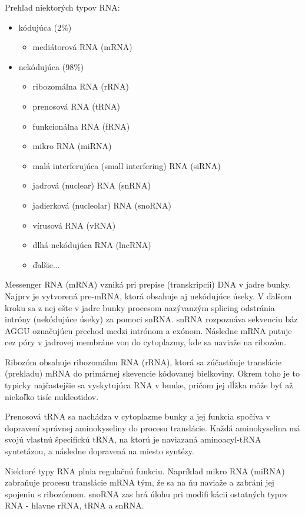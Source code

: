 \indent Prehľad niektorých typov RNA:
\begin{itemize}
\item kódujúca (2\%)
\begin{itemize}
\item mediátorová RNA (mRNA)
\end{itemize}
\item nekódujúca (98\%)
\begin{itemize}
\item ribozomálna RNA (rRNA)
\item prenosová RNA (tRNA)
\item funkcionálna RNA (fRNA)
\item mikro RNA (miRNA)
\item malá interferujúca (small interfering) RNA (siRNA)
\item jadrová (nuclear) RNA (snRNA)
\item jadierková (nucleolar) RNA (snoRNA)
\item vírusová RNA (vRNA)
\item dlhá nekódujúca RNA (lncRNA)
\item ďalšie...
\end{itemize}
\end{itemize}

\indent Messenger RNA (mRNA) vzniká pri prepise (transkripcii) DNA v jadre bunky. Najprv je vytvorená pre-mRNA, ktorá obsahuje aj nekódujúce úseky. V ďalšom kroku sa z nej ešte v jadre bunky procesom nazývanzým splicing odstránia intróny (nekódujúce úseky) za pomoci snRNA. snRNA rozpoznáva sekvenciu báz AGGU označujúcu prechod medzi intrónom  a exónom. Následne mRNA putuje cez póry v jadrovej membráne von do cytoplazmy, kde sa naviaže na ribozóm. \cite{Alberts02}


\indent Ribozóm obsahuje ribozomálnu RNA (rRNA), ktorá sa zúčastňuje translácie (prekladu) mRNA do primárnej skevencie kódovanej bielkoviny. Okrem toho je to typicky najčastejšie sa vyskytujúca RNA v bunke, pričom jej dĺžka môže byť až niekoľko tisíc nukleotidov.


\indent Prenosová tRNA sa nachádza v cytoplazme bunky a jej funkcia spočíva v dopravení správnej aminokyseliny do procesu translácie. Každá aminokyselina má svojú vlastnú špecifickú tRNA, na ktorú je naviazaná aminoacyl-tRNA syntetázou, a následne dopravená na miesto syntézy.


\indent  Niektoré typy RNA plnia regulačnú funkciu. Napríklad mikro RNA (miRNA) zabraňuje procesu translácie mRNA tým, že sa na ňu naviaže a zabráni jej spojeniu s ribozómom. snoRNA zas hrá úlohu pri modifikácii ostatných typov RNA - hlavne rRNA, tRNA a snRNA.


